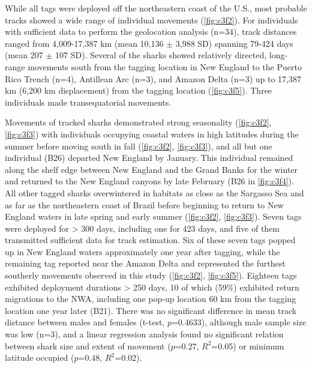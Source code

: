 While all tags were deployed off the northeastern coast of the U.S., most probable tracks showed a wide range of individual movements (\cref{fig:c3f2}). For individuals with sufficient data to perform the geolocation analysis (n=34), track distances ranged from 4,009-17,387 km (mean 10,136 $\pm$ 3,988 SD) spanning 79-424 days (mean 207 $\pm$ 107 SD). Several of the sharks showed relatively directed, long-range movements south from the tagging location in New England to the Puerto Rico Trench (n=4), Antillean Arc (n=3), and Amazon Delta (n=3) up to 17,387 km (6,200 km displacement) from the tagging location (\cref{fig:c3f5}). Three individuals made transequatorial movements.

Movements of tracked sharks demonstrated strong seasonality (\cref{fig:c3f2}, \cref{fig:c3f3}) with individuals occupying coastal waters in high latitudes during the summer before moving south in fall (\cref{fig:c3f2}, \cref{fig:c3f3}), and all but one individual (B26) departed New England by January. This individual remained along the shelf edge between New England and the Grand Banks for the winter and returned to the New England canyons by late February (B26 in \cref{fig:c3f4}). All other tagged sharks overwintered in habitats as close as the Sargasso Sea and as far as the northeastern coast of Brazil before beginning to return to New England waters in late spring and early summer (\cref{fig:c3f2}, \cref{fig:c3f3}). Seven tags were deployed for > 300 days, including one for 423 days, and five of them transmitted sufficient data for track estimation. Six of these seven tags popped up in New England waters approximately one year after tagging, while the remaining tag reported near the Amazon Delta and represented the furthest southerly movements observed in this study (\cref{fig:c3f2}, \cref{fig:c3f5}). Eighteen tags exhibited deployment durations > 250 days, 10 of which (59\%) exhibited return migrations to the NWA, including one pop-up location 60 km from the tagging location one year later (B21). There was no significant difference in mean track distance between males and females (t-test, $p$=0.4633), although male sample size was low (n=3), and a linear regression analysis found no significant relation between shark size and extent of movement ($p$=0.27, $R^2$=0.05) or minimum latitude occupied ($p$=0.48, $R^2$=0.02).

\clearpage


